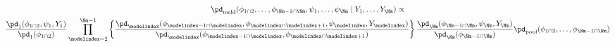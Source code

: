 \begin{multline}
  \pd_{\text{meld}}(\phi_{1 \cap 2}, \ldots, \phi_{\Nm - 1 \cap \Nm}, \psi_{1}, \ldots, \psi_{\Nm} \mid Y_{1}, \ldots, Y_{\Nm}) \propto \\ 
  \frac {
      \pd_{1} (\phi_{1 \cap 2}, \psi_{1}, Y_{1})
    } {
      \pd_{1}(\phi_{1 \cap 2})
    }
  \prod_{\modelindex = 2}^{\Nm - 1} \left\{
    \frac {
      \pd_{\modelindex} (\phi_{\modelindex - 1 \cap \modelindex}, \phi_{\modelindex \cap \modelindex + 1}, \psi_{\modelindex}, Y_{\modelindex})
    } {
      \pd_{\modelindex}(\phi_{\modelindex - 1 \cap \modelindex}, \phi_{\modelindex \cap \modelindex + 1})
    }
  \right\}
  \frac {
    \pd_{\Nm} (\phi_{\Nm - 1 \cap \Nm}, \psi_{\Nm}, Y_{\Nm})
  } {
    \pd_{\Nm}(\phi_{\Nm - 1 \cap \Nm})
  }
  \pd_{\text{pool}}(\phi_{1 \cap 2}, \ldots, \phi_{\Nm - 1 \cap \Nm}) 
  \label{eqn:stage-Mplus1-target}
\end{multline}